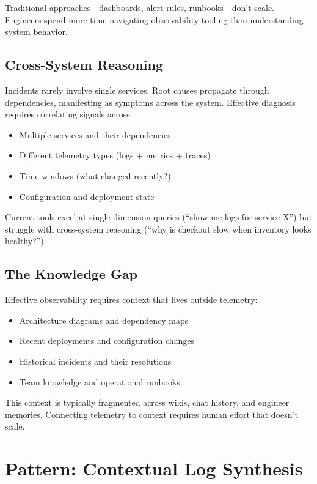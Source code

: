 Traditional approaches---dashboards, alert rules, runbooks---don't scale. Engineers spend more time navigating observability tooling than understanding system behavior.

\subsection{Cross-System Reasoning}
\label{subsec:cross-system-reasoning}

Incidents rarely involve single services. Root causes propagate through dependencies, manifesting as symptoms across the system. Effective diagnosis requires correlating signals across:

\begin{itemize}
    \item Multiple services and their dependencies
    \item Different telemetry types (logs + metrics + traces)
    \item Time windows (what changed recently?)
    \item Configuration and deployment state
\end{itemize}

Current tools excel at single-dimension queries (``show me logs for service X'') but struggle with cross-system reasoning (``why is checkout slow when inventory looks healthy?'').

\subsection{The Knowledge Gap}
\label{subsec:knowledge-gap}

Effective observability requires context that lives outside telemetry:

\begin{itemize}
    \item Architecture diagrams and dependency maps
    \item Recent deployments and configuration changes
    \item Historical incidents and their resolutions
    \item Team knowledge and operational runbooks
\end{itemize}

This context is typically fragmented across wikis, chat history, and engineer memories. Connecting telemetry to context requires human effort that doesn't scale.

\section{Pattern: Contextual Log Synthesis}
\label{sec:log-synthesis}

